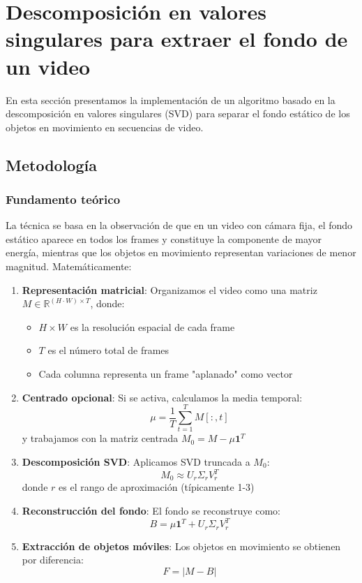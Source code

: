 \documentclass[12pt]{article}
\begin{document}
\section{Descomposición en valores singulares para extraer el fondo de un video}

En esta sección presentamos la implementación de un algoritmo basado en la descomposición en valores singulares (SVD) para separar el fondo estático de los objetos en movimiento en secuencias de video.

\subsection{Metodología}

\subsubsection{Fundamento teórico}

La técnica se basa en la observación de que en un video con cámara fija, el fondo estático aparece en todos los frames y constituye la componente de mayor energía, mientras que los objetos en movimiento representan variaciones de menor magnitud. Matemáticamente:

\begin{enumerate}
    \item \textbf{Representación matricial}: Organizamos el video como una matriz $M \in \mathbb{R}^{(H \cdot W) \times T}$, donde:
    \begin{itemize}
        \item $H \times W$ es la resolución espacial de cada frame
        \item $T$ es el número total de frames
        \item Cada columna representa un frame "aplanado" como vector
    \end{itemize}
    
    \item \textbf{Centrado opcional}: Si se activa, calculamos la media temporal:
    \[
    \mu = \frac{1}{T} \sum_{t=1}^{T} M[:,t]
    \]
    y trabajamos con la matriz centrada $M_0 = M - \mu \mathbf{1}^T$
    
    \item \textbf{Descomposición SVD}: Aplicamos SVD truncada a $M_0$:
    \[
    M_0 \approx U_r \Sigma_r V_r^T
    \]
    donde $r$ es el rango de aproximación (típicamente 1-3)
    
    \item \textbf{Reconstrucción del fondo}: El fondo se reconstruye como:
    \[
    B = \mu \mathbf{1}^T + U_r \Sigma_r V_r^T
    \]
    
    \item \textbf{Extracción de objetos móviles}: Los objetos en movimiento se obtienen por diferencia:
    \[
    F = |M - B|
    \]
\end{enumerate}
\end{document}
